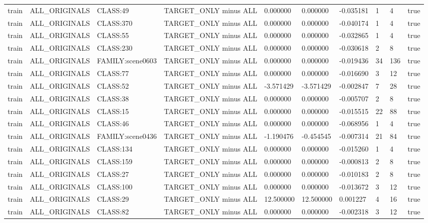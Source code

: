 \begin{tabular}{llllllllll}
train & ALL\_ORIGINALS & CLASS:49 & TARGET\_ONLY minus ALL & 0.000000 & 0.000000 & -0.035181 & 1 & 4 & true \\
train & ALL\_ORIGINALS & CLASS:370 & TARGET\_ONLY minus ALL & 0.000000 & 0.000000 & -0.040174 & 1 & 4 & true \\
train & ALL\_ORIGINALS & CLASS:55 & TARGET\_ONLY minus ALL & 0.000000 & 0.000000 & -0.032865 & 1 & 4 & true \\
train & ALL\_ORIGINALS & CLASS:230 & TARGET\_ONLY minus ALL & 0.000000 & 0.000000 & -0.030618 & 2 & 8 & true \\
train & ALL\_ORIGINALS & FAMILY:scene0603 & TARGET\_ONLY minus ALL & 0.000000 & 0.000000 & -0.019436 & 34 & 136 & true \\
train & ALL\_ORIGINALS & CLASS:77 & TARGET\_ONLY minus ALL & 0.000000 & 0.000000 & -0.016690 & 3 & 12 & true \\
train & ALL\_ORIGINALS & CLASS:52 & TARGET\_ONLY minus ALL & -3.571429 & -3.571429 & -0.002847 & 7 & 28 & true \\
train & ALL\_ORIGINALS & CLASS:38 & TARGET\_ONLY minus ALL & 0.000000 & 0.000000 & -0.005707 & 2 & 8 & true \\
train & ALL\_ORIGINALS & CLASS:15 & TARGET\_ONLY minus ALL & 0.000000 & 0.000000 & -0.015515 & 22 & 88 & true \\
train & ALL\_ORIGINALS & CLASS:46 & TARGET\_ONLY minus ALL & 0.000000 & 0.000000 & -0.068956 & 1 & 4 & true \\
train & ALL\_ORIGINALS & FAMILY:scene0436 & TARGET\_ONLY minus ALL & -1.190476 & -0.454545 & -0.007314 & 21 & 84 & true \\
train & ALL\_ORIGINALS & CLASS:134 & TARGET\_ONLY minus ALL & 0.000000 & 0.000000 & -0.015260 & 1 & 4 & true \\
train & ALL\_ORIGINALS & CLASS:159 & TARGET\_ONLY minus ALL & 0.000000 & 0.000000 & -0.000813 & 2 & 8 & true \\
train & ALL\_ORIGINALS & CLASS:27 & TARGET\_ONLY minus ALL & 0.000000 & 0.000000 & -0.010183 & 2 & 8 & true \\
train & ALL\_ORIGINALS & CLASS:100 & TARGET\_ONLY minus ALL & 0.000000 & 0.000000 & -0.013672 & 3 & 12 & true \\
train & ALL\_ORIGINALS & CLASS:29 & TARGET\_ONLY minus ALL & 12.500000 & 12.500000 & 0.001227 & 4 & 16 & true \\
train & ALL\_ORIGINALS & CLASS:82 & TARGET\_ONLY minus ALL & 0.000000 & 0.000000 & -0.002318 & 3 & 12 & true \\

\end{tabular}
